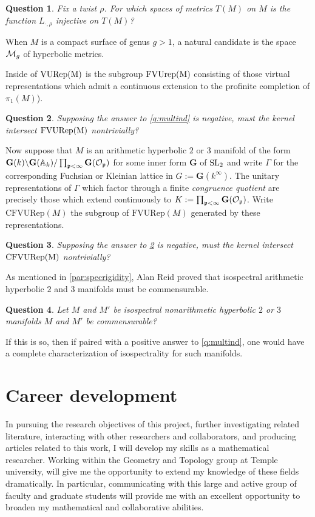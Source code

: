 \documentclass[12pt]{article}
\newtheorem{question}{Question}
\begin{document}
\begin{question}
 Fix a twist $\rho$. For which spaces of metrics $T(M)$ on $M$ is the function $L_{\cdot, \rho}$ injective on $T(M)$?
\end{question}
When $M$ is a compact surface of genus $g>1$, a natural candidate is the space $\mathcal{M}_g$ of hyperbolic metrics.

Inside of ${\rm VURep(M)}$ is the subgroup ${\rm FVUrep(M)}$ consisting of those virtual representations which admit a continuous extension to the profinite completion of $\pi_1(M)$). 
\begin{question}\label{q:multind2}
	Supposing the answer to \cref{q:multind} is negative, must the kernel intersect ${\rm FVURep(M)}$ nontrivially? 
\end{question}
Now suppose that $M$ is an arithmetic hyperbolic $2$ or $3$ manifold of the form $ \mathbf{G}(k) \backslash \mathbf{G}(\mathbb{A}_k) / \prod_{\mathfrak{p}<\infty} \mathbf{G}(\mathcal{O}_{\mathfrak{p}}) $  for some inner form $\mathbf{G}$ of $\operatorname{SL}_2$ and write $\Gamma $ for the corresponding  Fuchsian or Kleinian lattice in $G:= \mathbf{G}(k^\infty)$. The unitary representations of $\Gamma$ which factor through a finite \emph{congruence quotient} are precisely those which extend continuously to $K:= \prod_{\mathfrak{p}<\infty} \mathbf{G}(\mathcal{O}_{\mathfrak{p}})$. Write $\mathrm{CFVURep}(M)$ the subgroup of $\mathrm{FVURep}(M)$ generated by these representations.  
\begin{question}\label{q:multind3}
	Supposing the answer to \cref{q:multind2} is negative, must the kernel intersect ${\rm CFVURep(M)}$ nontrivially? 
\end{question}

As mentioned in \cref{par:specrigidity}, Alan Reid proved that isospectral arithmetic hyperbolic $2$ and $3$ manifolds must be commensurable.  
\begin{question}
  Let $M$ and $M'$ be isospectral nonarithmetic hyperbolic $2$ or $3$ manifolds
  $M$ and $M'$ be commensurable?  
  \end{question}
If this is so, then if paired with a positive answer to \cref{q:multind}, one would have a complete characterization of isospectrality for such manifolds. 
 
\section{Career development}
In pursuing the research objectives of this project, further investigating related literature, interacting with
other researchers and collaborators, and producing articles related to this work, I will develop my skills as
a mathematical researcher. Working within the 
Geometry and Topology group at Temple university,  will give me the opportunity to extend my knowledge of these fields dramatically. In particular, communicating with this large and active group of faculty and graduate students will provide me with an excellent opportunity to broaden my mathematical and collaborative abilities. 
 	
\end{document}
